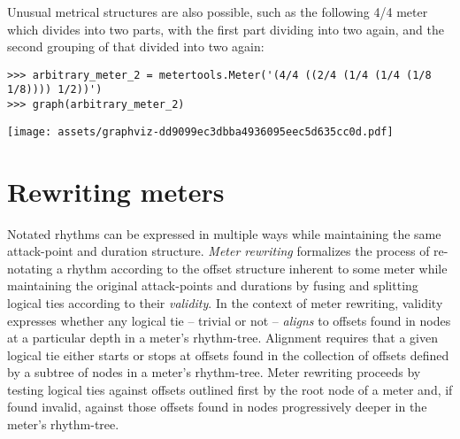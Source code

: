 \noindent Unusual metrical structures are also possible, such as the following
4/4 meter which divides into two parts, with the first part dividing into two
again, and the second grouping of that divided into two again:

\begin{comment}
<abjad>
arbitrary_meter_2 = metertools.Meter('(4/4 ((2/4 (1/4 (1/4 (1/8 1/8)))) 1/2))')
graph(arbitrary_meter_2)
</abjad>
\end{comment}

\begin{abjadbookoutput}
\begin{singlespacing}
\vspace{-0.5\baselineskip}
\begin{verbatim}
>>> arbitrary_meter_2 = metertools.Meter('(4/4 ((2/4 (1/4 (1/4 (1/8 1/8)))) 1/2))')
>>> graph(arbitrary_meter_2)
\end{verbatim}
\noindent\texttt{[image: assets/graphviz-dd9099ec3dbba4936095eec5d635cc0d.pdf]}
\end{singlespacing}
\end{abjadbookoutput}

\section{Rewriting meters}
\label{sec:rewriting-meters}


Notated rhythms can be expressed in multiple ways while maintaining the same
attack-point and duration structure. \emph{Meter rewriting} formalizes the
process of re-notating a rhythm according to the offset structure inherent to
some meter while maintaining the original attack-points and durations by fusing
and splitting logical ties according to their \emph{validity}. In the context
of meter rewriting, validity expresses whether any logical tie -- trivial or
not -- \emph{aligns} to offsets found in nodes at a particular depth in a
meter's rhythm-tree. Alignment requires that a given logical tie either starts
or stops at offsets found in the collection of offsets defined by a subtree of
nodes in a meter's rhythm-tree. Meter rewriting proceeds by testing logical
ties against offsets outlined first by the root node of a meter and, if found
invalid, against those offsets found in nodes progressively deeper in the
meter's rhythm-tree.

